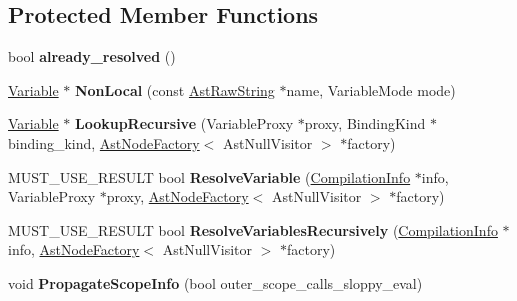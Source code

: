 \subsection*{Protected Member Functions}
\begin{DoxyCompactItemize}
\item 
\hypertarget{classv8_1_1internal_1_1_scope_ada85f14d546573a3bc19cd9e178919f3}{}bool {\bfseries already\+\_\+resolved} ()\label{classv8_1_1internal_1_1_scope_ada85f14d546573a3bc19cd9e178919f3}

\item 
\hypertarget{classv8_1_1internal_1_1_scope_a9eba98dc3a09d007affff9871534ae04}{}\hyperlink{classv8_1_1internal_1_1_variable}{Variable} $\ast$ {\bfseries Non\+Local} (const \hyperlink{classv8_1_1internal_1_1_ast_raw_string}{Ast\+Raw\+String} $\ast$name, Variable\+Mode mode)\label{classv8_1_1internal_1_1_scope_a9eba98dc3a09d007affff9871534ae04}

\item 
\hypertarget{classv8_1_1internal_1_1_scope_a4f5740e6dc415f00b9fce95d259c7b39}{}\hyperlink{classv8_1_1internal_1_1_variable}{Variable} $\ast$ {\bfseries Lookup\+Recursive} (Variable\+Proxy $\ast$proxy, Binding\+Kind $\ast$binding\+\_\+kind, \hyperlink{classv8_1_1internal_1_1_ast_node_factory}{Ast\+Node\+Factory}$<$ Ast\+Null\+Visitor $>$ $\ast$factory)\label{classv8_1_1internal_1_1_scope_a4f5740e6dc415f00b9fce95d259c7b39}

\item 
\hypertarget{classv8_1_1internal_1_1_scope_a79c1137dd9cfb144f8314166db770b46}{}M\+U\+S\+T\+\_\+\+U\+S\+E\+\_\+\+R\+E\+S\+U\+L\+T bool {\bfseries Resolve\+Variable} (\hyperlink{classv8_1_1internal_1_1_compilation_info}{Compilation\+Info} $\ast$info, Variable\+Proxy $\ast$proxy, \hyperlink{classv8_1_1internal_1_1_ast_node_factory}{Ast\+Node\+Factory}$<$ Ast\+Null\+Visitor $>$ $\ast$factory)\label{classv8_1_1internal_1_1_scope_a79c1137dd9cfb144f8314166db770b46}

\item 
\hypertarget{classv8_1_1internal_1_1_scope_afa5634e1f0f8fed6bd4373bbcf07327b}{}M\+U\+S\+T\+\_\+\+U\+S\+E\+\_\+\+R\+E\+S\+U\+L\+T bool {\bfseries Resolve\+Variables\+Recursively} (\hyperlink{classv8_1_1internal_1_1_compilation_info}{Compilation\+Info} $\ast$info, \hyperlink{classv8_1_1internal_1_1_ast_node_factory}{Ast\+Node\+Factory}$<$ Ast\+Null\+Visitor $>$ $\ast$factory)\label{classv8_1_1internal_1_1_scope_afa5634e1f0f8fed6bd4373bbcf07327b}

\item 
\hypertarget{classv8_1_1internal_1_1_scope_a6390197be39cee93c4e988529a4733a0}{}void {\bfseries Propagate\+Scope\+Info} (bool outer\+\_\+scope\+\_\+calls\+\_\+sloppy\+\_\+eval)\label{classv8_1_1internal_1_1_scope_a6390197be39cee93c4e988529a4733a0}


\end{DoxyCompactItemize}
